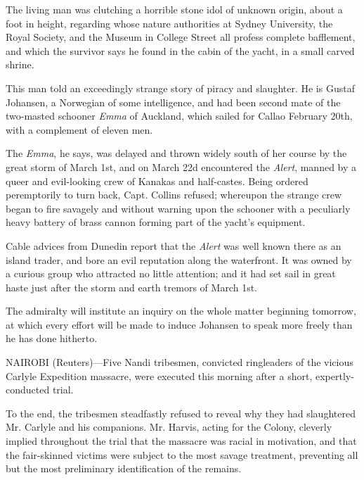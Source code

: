 \documentclass{newspaper1920}
\def\minipageheight{37}
\begin{document}
\begin{multicols}{3}
\begin{minipage}[t][\minipageheight\baselineskip]{2\columnwidth+1\columnsep}
\begin{multicols}{2}
The living man was clutching a horrible stone idol of unknown origin,
about a foot in height, regarding whose nature authorities at Sydney
University, the Royal Society, and the Museum in College Street all
profess complete bafflement, and which the survivor says he found in
the cabin of the yacht, in a small carved shrine.

This man told an exceedingly strange story of piracy and slaughter.
He is Gustaf Johansen, a Norwegian of some intelligence, and had been
second mate of the two-masted schooner \emph{Emma} of Auckland, which
sailed for Callao February 20th, with a complement of eleven men.

The \emph{Emma}, he says, was delayed and thrown widely south of her
course by the great storm of March 1st, and on March 22d encountered
the \emph{Alert}, manned by a queer and evil-looking crew of Kanakas
and half-castes.  Being ordered peremptorily to turn back,
Capt. Collins refused; whereupon the strange crew began to fire
savagely and without warning upon the schooner with a peculiarly
heavy battery of brass cannon forming part of the yacht's equipment.

Cable advices from Dunedin report that the \emph{Alert} was well known
there as an island trader, and bore an evil reputation along the
waterfront.  It was owned by a curious group who attracted no little
attention; and it had set sail in great haste just after the storm and
earth tremors of March 1st.


The admiralty will institute an inquiry on the whole matter beginning
tomorrow, at which every effort will be made to induce Johansen to
speak more freely than he has done hitherto.

\end{multicols}

\vspace{-\baselineskip}\fullrule

\end{minipage}


NAIROBI (Reuters)---Five Nandi tribesmen, convicted ringleaders of
the vicious Carlyle Expedition massacre, were executed this morning
after a short, expertly-conducted trial.

To the end, the tribesmen steadfastly refused to reveal why they had
slaughtered Mr. Carlyle and his companions.  Mr. Harvis, acting for
the Colony, cleverly implied throughout the trial that the massacre
was racial in motivation, and that the fair-skinned victims were
subject to the most savage treatment, preventing all but the most
preliminary identification of the remains.


\end{multicols}
\end{document}

